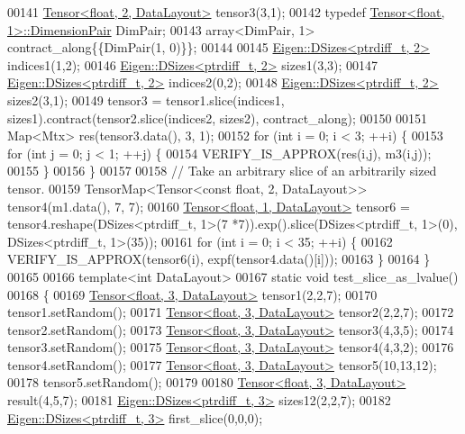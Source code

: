 \begin{DoxyCode}
00141   \hyperlink{class_eigen_1_1_tensor}{Tensor<float, 2, DataLayout>} tensor3(3,1);
00142   \textcolor{keyword}{typedef} \hyperlink{class_eigen_1_1_tensor}{Tensor<float, 1>::DimensionPair} DimPair;
00143   array<DimPair, 1> contract\_along\{\{DimPair(1, 0)\}\};
00144 
00145   \hyperlink{struct_eigen_1_1_d_sizes}{Eigen::DSizes<ptrdiff\_t, 2>} indices1(1,2);
00146   \hyperlink{struct_eigen_1_1_d_sizes}{Eigen::DSizes<ptrdiff\_t, 2>} sizes1(3,3);
00147   \hyperlink{struct_eigen_1_1_d_sizes}{Eigen::DSizes<ptrdiff\_t, 2>} indices2(0,2);
00148   \hyperlink{struct_eigen_1_1_d_sizes}{Eigen::DSizes<ptrdiff\_t, 2>} sizes2(3,1);
00149   tensor3 = tensor1.slice(indices1, sizes1).contract(tensor2.slice(indices2, sizes2), contract\_along);
00150 
00151   Map<Mtx> res(tensor3.data(), 3, 1);
00152   \textcolor{keywordflow}{for} (\textcolor{keywordtype}{int} i = 0; i < 3; ++i) \{
00153     \textcolor{keywordflow}{for} (\textcolor{keywordtype}{int} j = 0; j < 1; ++j) \{
00154       VERIFY\_IS\_APPROX(res(i,j), m3(i,j));
00155     \}
00156   \}
00157 
00158   \textcolor{comment}{// Take an arbitrary slice of an arbitrarily sized tensor.}
00159   TensorMap<Tensor<const float, 2, DataLayout>> tensor4(m1.data(), 7, 7);
00160   \hyperlink{class_eigen_1_1_tensor}{Tensor<float, 1, DataLayout>} tensor6 = tensor4.reshape(DSizes<ptrdiff\_t, 1>(7
      *7)).exp().slice(DSizes<ptrdiff\_t, 1>(0), DSizes<ptrdiff\_t, 1>(35));
00161   \textcolor{keywordflow}{for} (\textcolor{keywordtype}{int} i = 0; i < 35; ++i) \{
00162     VERIFY\_IS\_APPROX(tensor6(i), expf(tensor4.data()[i]));
00163   \}
00164 \}
00165 
00166 \textcolor{keyword}{template}<\textcolor{keywordtype}{int} DataLayout>
00167 \textcolor{keyword}{static} \textcolor{keywordtype}{void} test\_slice\_as\_lvalue()
00168 \{
00169   \hyperlink{class_eigen_1_1_tensor}{Tensor<float, 3, DataLayout>} tensor1(2,2,7);
00170   tensor1.setRandom();
00171   \hyperlink{class_eigen_1_1_tensor}{Tensor<float, 3, DataLayout>} tensor2(2,2,7);
00172   tensor2.setRandom();
00173   \hyperlink{class_eigen_1_1_tensor}{Tensor<float, 3, DataLayout>} tensor3(4,3,5);
00174   tensor3.setRandom();
00175   \hyperlink{class_eigen_1_1_tensor}{Tensor<float, 3, DataLayout>} tensor4(4,3,2);
00176   tensor4.setRandom();
00177   \hyperlink{class_eigen_1_1_tensor}{Tensor<float, 3, DataLayout>} tensor5(10,13,12);
00178   tensor5.setRandom();
00179 
00180   \hyperlink{class_eigen_1_1_tensor}{Tensor<float, 3, DataLayout>} result(4,5,7);
00181   \hyperlink{struct_eigen_1_1_d_sizes}{Eigen::DSizes<ptrdiff\_t, 3>} sizes12(2,2,7);
00182   \hyperlink{struct_eigen_1_1_d_sizes}{Eigen::DSizes<ptrdiff\_t, 3>} first\_slice(0,0,0);

\end{DoxyCode}
